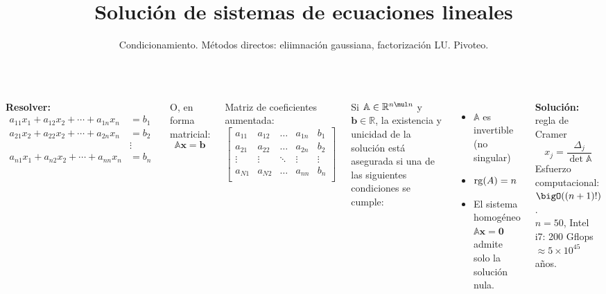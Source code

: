 \documentclass[9pt, aspectratio=169]{beamer}
\title{Solución de sistemas de ecuaciones lineales}
\subtitle{Condicionamiento. Métodos directos: eliimnación gaussiana, factorización LU. Pivoteo.}
\begin{document}
\maketitle

\begin{frame}
\begin{columns}[t]
\textbf{Resolver:}
\begin{align*}
    a_{11}x_1+a_{12}x_2+\cdots +a_{1n}x_n &= b_1 \\
    a_{21}x_2+a_{22}x_2+\cdots +a_{2n}x_n &= b_2 \\
                                   & \vdots \\
    a_{n1}x_1+a_{n2}x_2+\cdots +a_{nn}x_n &= b_n \\
 \end{align*} \pause
\vspace{-2em}

 O, en forma matricial:
 \begin{equation*}
  \mathbb{A} \mathbf{x} = \mathbf{b}
 \end{equation*}  \pause
\vspace{-1em}

  Matriz de coeficientes aumentada:
\begin{equation*}
 \left[ 
 \begin{array}{cccc|c}
 a_{11} & a_{12} & \ldots & a_{1n} & b_1 \\
 a_{21} & a_{22} & \ldots & a_{2n} & b_2\\
 \vdots & \vdots & \ddots & \vdots & \vdots\\
 a_{N1} & a_{N2} & \ldots & a_{nn} & b_n \\
 \end{array} \right] 
\end{equation*} \pause


Si $\mathbb{A} \in \mathbb{R}^{n \mul n}$ y $\bm{b} \in \mathbb{R}$, la existencia y unicidad de la solución está asegurada si una de las siguientes condiciones se cumple:
\begin{itemize}
    \item $\mathbb{A}$ es invertible (no singular)
    \item $\operatorname{rg}(A) = n$
    \item El sistema homogéneo $\mathbb{A} \bm{x} = \bm{0}$ admite solo la solución nula.
\end{itemize}

\hrulefill \pause \vspace{1em}


\textbf{Solución:} regla de Cramer
\[ x_j = \frac{\Delta_j}{\det{\mathbb{A}}} \]
Esfuerzo computacional: $\bigO((n+ 1)!)$. \\
$n = 50$, Intel i7: 200 Gflops $\approx 5 \times 10^{45}$ años.

\end{columns}
\end{frame}
\end{document}
